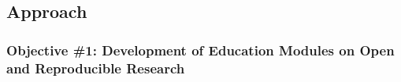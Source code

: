 \documentclass[12pt,letterpaper]{article}
\begin{document}
\subsection{Approach}



 
 
 
 
 


\subsubsection{Objective \#1: Development of Education Modules on Open and Reproducible Research}
\end{document}
